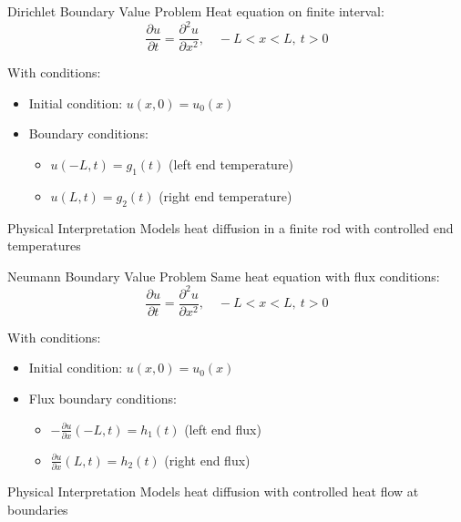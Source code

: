 \documentclass{beamer}
\begin{document}
\begin{frame}{Dirichlet Boundary Value Problem}
    Heat equation on finite interval:
    \[
    \frac{\partial u}{\partial t} = \frac{\partial^2 u}{\partial x^2}, \quad -L < x < L, \ t > 0
    \]
    
    With conditions:
    \begin{itemize}
        \item Initial condition: $u(x,0) = u_0(x)$
        \item Boundary conditions:
        \begin{itemize}
            \item $u(-L,t) = g_1(t)$ (left end temperature)
            \item $u(L,t) = g_2(t)$ (right end temperature)
        \end{itemize}
    \end{itemize}
    
    \begin{block}{Physical Interpretation}
        Models heat diffusion in a finite rod with controlled end temperatures
    \end{block}
\end{frame}

\begin{frame}{Neumann Boundary Value Problem}
    Same heat equation with flux conditions:
    \[
    \frac{\partial u}{\partial t} = \frac{\partial^2 u}{\partial x^2}, \quad -L < x < L, \ t > 0
    \]
    
    With conditions:
    \begin{itemize}
        \item Initial condition: $u(x,0) = u_0(x)$
        \item Flux boundary conditions:
        \begin{itemize}
            \item $-\frac{\partial u}{\partial x}(-L,t) = h_1(t)$ (left end flux)
            \item $\frac{\partial u}{\partial x}(L,t) = h_2(t)$ (right end flux)
        \end{itemize}
    \end{itemize}
    
    \begin{block}{Physical Interpretation}
        Models heat diffusion with controlled heat flow at boundaries
    \end{block}
\end{frame}
\end{document}
